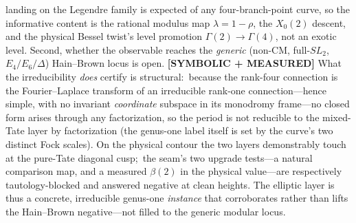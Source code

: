 \documentclass[aps,pra,twocolumn,superscriptaddress,longbibliography]{revtex4-2}
\begin{document}
landing on the Legendre family is expected of any four-branch-point curve, so the
informative content is the rational modulus map $\lambda = 1-\rho$, the
$X_0(2)$ descent, and the physical Bessel twist's level promotion
$\Gamma(2)\to\Gamma(4)$, not an exotic level.  Second, whether the observable
reaches the \emph{generic} (non-CM, full-$SL_2$, $E_4/E_6/\Delta$) Hain--Brown
locus is open.  \textbf{[SYMBOLIC + MEASURED]} What the irreducibility \emph{does} certify is structural:\
because the rank-four connection is the Fourier--Laplace transform of an
irreducible rank-one connection---hence simple, with no invariant
\emph{coordinate} subspace in its monodromy frame---no closed form arises
through any factorization, so the period is not reducible to the mixed-Tate
layer by factorization (the genus-one label itself is set by the curve's two
distinct Fock scales).  On the physical contour the two layers demonstrably
touch at the pure-Tate diagonal cusp;\ the seam's two upgrade tests---a natural
comparison map, and a measured $\beta(2)$ in the physical value---are
respectively tautology-blocked and answered negative at clean heights.  The
elliptic layer is thus a concrete, irreducible genus-one \emph{instance} that
corroborates rather than lifts the Hain--Brown negative---not filled to the
generic modular locus.
\end{document}
